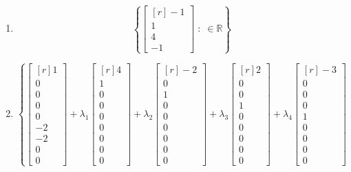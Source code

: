 \documentclass[12pt]{article}
\begin{document}
\begin{enumerate}
\[\;:\;\lambda_{1},\lambda_{2}\in\mathbb{R}\right\}
\]
\item\[\left\{\begin{bmatrix*}[r]-1\\1\\4\\-1\end{bmatrix*}
\;:\;\in\mathbb{R}\right\}
\]
\item\[\left\{\begin{bmatrix*}[r]1\\0\\0\\0\\0\\-2\\-2\\0\\0\end{bmatrix*}
+\lambda_{1}\begin{bmatrix*}[r]4\\1\\0\\0\\0\\0\\0\\0\\0\end{bmatrix*}
+\lambda_{2}\begin{bmatrix*}[r]-2\\0\\1\\0\\0\\0\\0\\0\\0\end{bmatrix*}
+\lambda_{3}\begin{bmatrix*}[r]2\\0\\0\\1\\0\\0\\0\\0\\0\end{bmatrix*}
+\lambda_{4}\begin{bmatrix*}[r]-3\\0\\0\\0\\1\\0\\0\\0\\0\end{bmatrix*}
\]
\end{enumerate}
\end{document}
